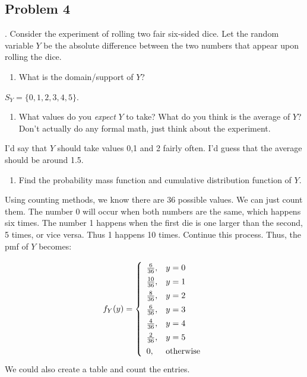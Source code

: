 \documentclass[
]{book}
\providecommand{\tightlist}{%
  \setlength{\itemsep}{0pt}\setlength{\parskip}{0pt}}
\begin{document}
\hypertarget{problem-4-3}{%
\subsection{Problem 4}\label{problem-4-3}}

. Consider the experiment of rolling two fair six-sided dice. Let the random variable \(Y\) be the absolute difference between the two numbers that appear upon rolling the dice.

\begin{enumerate}
\def\labelenumi{\alph{enumi}.}
\tightlist
\item
  What is the domain/support of \(Y\)?
\end{enumerate}

\(S_Y=\{0,1,2,3,4,5\}\).

\begin{enumerate}
\def\labelenumi{\alph{enumi}.}
\setcounter{enumi}{1}
\tightlist
\item
  What values do you \emph{expect} \(Y\) to take? What do you think is the average of \(Y\)? Don't actually do any formal math, just think about the experiment.
\end{enumerate}

I'd say that \(Y\) should take values 0,1 and 2 fairly often. I'd guess that the average should be around 1.5.

\begin{enumerate}
\def\labelenumi{\alph{enumi}.}
\setcounter{enumi}{2}
\tightlist
\item
  Find the probability mass function and cumulative distribution function of \(Y\).
\end{enumerate}

Using counting methods, we know there are 36 possible values. We can just count them. The number 0 will occur when both numbers are the same, which happens six times. The number 1 happens when the first die is one larger than the second, 5 times, or vice versa. Thus 1 happens 10 times. Continue this process. Thus, the pmf of \(Y\) becomes:

\[
f_Y(y)=\left\{ \renewcommand{\arraystretch}{1.4} \begin{array}{ll} \frac{6}{36}, & y=0 \\
\frac{10}{36}, & y=1 \\
\frac{8}{36}, & y=2 \\
\frac{6}{36}, & y=3 \\
\frac{4}{36}, & y=4 \\
\frac{2}{36}, & y=5 \\
0, & \mbox{otherwise} \end{array} \right . 
\]
We could also create a table and count the entries.
\end{document}
